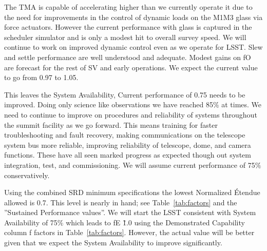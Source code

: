 The TMA is capable of accelerating higher than we currently operate it due to the need for improvements in the control of dynamic loads on the M1M3 glass via force actuators. However the current performance with glass is captured in the scheduler simulator and is only a modest hit to overall survey speed. We will continue to work on improved dynamic control even as we operate for LSST. Slew and settle performance are well understood and adequate. Modest gains on fO are forecast for the rest of SV and early operations. We expect the current value to go from 0.97 to 1.05. 

This leaves the System Availability, Current performance of 0.75 needs to be improved. Doing only science like observations we have reached 85$\%$ at times. We need to continue to improve on procedures and reliability of systems throughout the summit facility as we go forward. This means training for faster troubleshooting and fault recovery, making communications on the telescope system bus more reliable, improving reliability of telescope, dome, and camera functions. These have all seen marked progress as expected though out system integration, test, and commissioning. We will assume current performance of 75$\%$ conservatively. 

Using the combined SRD minimum specifications the lowest Normalized \'{E}tendue allowed is 0.7. This level is nearly in hand; see Table~\ref{tab:factors} and the ''Sustained Performance values''. We will start the LSST consistent with System Availability of 75$\%$ which leads to fE \~1.0 using the Demonstrated Capability column f factors in Table~\ref{tab:factors}. However, the actual value will be better given that we expect the System Availability to improve significantly. 

\newpage
